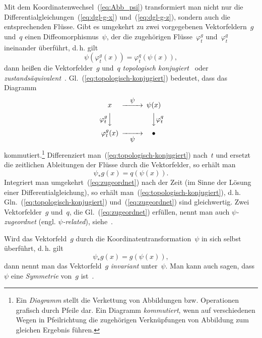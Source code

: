 \begin{remark}
Mit dem Koordinatenwechsel~(\ref{eq:Abb_psi}) transformiert man
nicht nur die Differentialgleichungen~(\ref{eq:dgl-g-x}) und~(\ref{eq:dgl-g-z}),
sondern auch die entsprechenden Flüsse. Gibt es umgekehrt zu zwei
vorgegebenen Vektorfeldern~$g$ und~$q$ einen Diffeomorphismus~$\psi$,
der die zugehörigen Flüsse~$\varphi_{t}^{g}$ und~$\varphi_{t}^{q}$
ineinander überführt, d.\,h. gilt
\begin{equation}
\psi(\varphi_{t}^{g}(x))=\varphi_{t}^{q}(\psi(x)),\label{eq:topologisch-konjugiert}
\end{equation}
dann heißen die Vektorfelder~$g$ und~$q$ \emph{topologisch konjugiert}~\cite{guckenheimer83,arrowsmith90}
oder \emph{zustandsäquivalent}~\cite{dayawansa1985}.
Gl.~(\ref{eq:topologisch-konjugiert}) bedeutet, dass das Diagramm\[
\begin{CD}
x @>{\displaystyle\psi}>> \psi(x)\\
@V{\displaystyle\varphi_t^g}VV @VV{\displaystyle\varphi_t^{q}}V\\
\varphi_t^g(x) @>>{\displaystyle\psi}> \bullet
\end{CD}
\]kommutiert.\footnote{Ein \emph{Diagramm} stellt die Verkettung von Abbildungen bzw. Operationen
grafisch durch Pfeile dar. Ein Diagramm \emph{kommutiert}, wenn auf
verschiedenen Wegen in Pfeilrichtung die zugehörigen Verknüpfungen
von Abbildung zum gleichen Ergebnis führen.} Differenziert man~(\ref{eq:topologisch-konjugiert}) nach~$t$
und ersetzt die zeitlichen Ableitungen der Flüsse durch die Vektorfelder,
so erhält man 
\begin{equation}
\psi_{*}g(x)=q(\psi(x)).\label{eq:zugeordnet}
\end{equation}
Integriert man umgekehrt~(\ref{eq:zugeordnet}) nach der Zeit (im
Sinne der Lösung einer Differentialgleichung), so erhält man~(\ref{eq:topologisch-konjugiert}),
d.\,h. Gln.~(\ref{eq:topologisch-konjugiert}) und~(\ref{eq:zugeordnet})
sind gleichwertig. Zwei Vektorfelder~$g$ und~$q$, die Gl.~(\ref{eq:zugeordnet})
erfüllen, nennt man auch $\psi$\emph{-zugeordnet}
(engl. $\psi$\emph{-related}), siehe~\cite{lee2006}.

Wird das Vektorfeld~$g$ durch die Koordinatentransformation~$\psi$
in sich selbst überführt, d.\,h. gilt 
\begin{equation}
\psi_{*}g(x)=g(\psi(x)),\label{eq:invariant-unter-psi}
\end{equation}
dann nennt man das Vektorfeld~$g$ \emph{invariant}
unter~$\psi$. Man kann auch sagen, dass~$\psi$ eine \emph{Symmetrie}
von~$g$ ist~\cite{holm2009}.
\end{remark}


